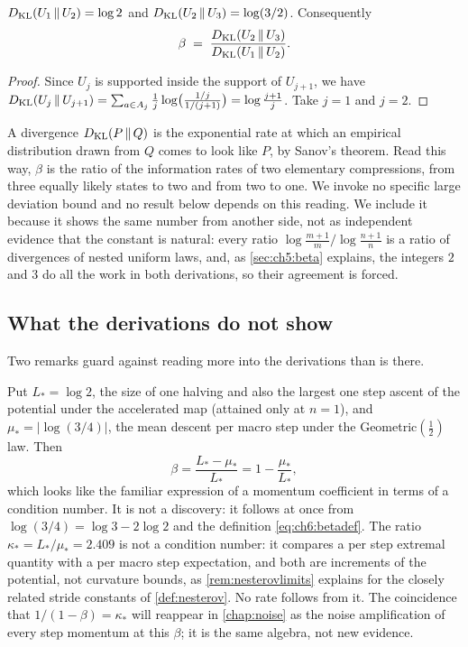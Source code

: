 \begin{lemma}\label{lem:ch6:kl}
$D_{\mathrm{KL}}(U_1\,\|\,U_2)=\log 2$ and $D_{\mathrm{KL}}(U_2\,\|\,U_3)=\log(3/2)$. Consequently
\begin{equation}\label{eq:ch6:betakl}
  \beta \;=\; \frac{D_{\mathrm{KL}}(U_2\,\|\,U_3)}{D_{\mathrm{KL}}(U_1\,\|\,U_2)}.
\end{equation}
\end{lemma}

\begin{proof}
Since $U_j$ is supported inside the support of $U_{j+1}$, we have
$D_{\mathrm{KL}}(U_j\,\|\,U_{j+1})=\sum_{a\in A_j}\tfrac1j\log\bigl(\tfrac{1/j}{1/(j+1)}\bigr)
=\log\tfrac{j+1}{j}$. Take $j=1$ and $j=2$.
\end{proof}

A divergence $D_{\mathrm{KL}}(P\,\|\,Q)$ is the exponential rate at which an empirical
distribution drawn from $Q$ comes to look like $P$, by Sanov's theorem. Read
this way, $\beta$ is the ratio of the information rates of two elementary
compressions, from three equally likely states to two and from two to one.
We invoke no specific large deviation bound and no result below depends on
this reading.
We include it because it shows the same number from another side, not as independent evidence that the constant is natural: every ratio $\log\frac{m+1}{m}\big/\log\frac{n+1}{n}$ is a ratio of divergences of nested uniform laws, and, as \cref{sec:ch5:beta} explains, the integers $2$ and $3$ do all the work in both derivations, so their agreement is forced.

\subsection{What the derivations do not show}

Two remarks guard against reading more into the derivations than is there.

\begin{remark}\label{rem:ch6:definitional}
Put $L_\ast=\log2$, the size of one halving and also the largest one step ascent of the potential under the accelerated map (attained only at $n=1$), and $\mu_\ast=|\log(3/4)|$, the mean descent per macro step under the Geometric$(\tfrac12)$ law.
Then
\[
  \beta=\frac{L_\ast-\mu_\ast}{L_\ast}=1-\frac{\mu_\ast}{L_\ast},
\]
which looks like the familiar expression of a momentum coefficient in terms of
a condition number. It is not a discovery: it follows at once from
$\log(3/4)=\log3-2\log2$ and the definition \eqref{eq:ch6:betadef}. The ratio
$\kappa_\ast=L_\ast/\mu_\ast=2.409$ is not a condition number: it compares a
per step extremal quantity with a per macro step expectation, and both are
increments of the potential, not curvature bounds, as \cref{rem:nesterovlimits}
explains for the closely related stride constants of \cref{def:nesterov}. No
rate follows from it. The coincidence that $1/(1-\beta)=\kappa_\ast$ will
reappear in \cref{chap:noise} as the noise amplification of every step
momentum at this $\beta$; it is the same algebra, not new evidence.
\end{remark}

